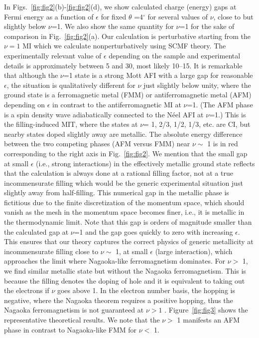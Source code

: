 \documentclass[aps,prl,floatfix,twocolumn]{revtex4-2}
\begin{document}
In Figs.~\ref{fig:fig2}(b)-\ref{fig:fig2}(d), we {show} calculated charge (energy) gaps {at Fermi energy} as a function of $\epsilon$ for fixed {$\theta$ =4$ ^\circ $} for several values of $\nu$, close to but slightly below $\nu$=1.  We also show the same quantity for $\nu$=1 for the sake of comparison in Fig.~\ref{fig:fig2}(a). Our calculation is perturbative starting from the $ \nu=1 $ {MI} which we calculate nonperturbatively using {SCMF} theory. The experimentally relevant value of $\epsilon$ depending on the sample and experimental details is approximately between 5 and 30, {most likely 10--15}.  It is remarkable that although the $\nu$=1 state is a strong Mott AFI with a large gap for {reasonable} $\epsilon$, the situation is qualitatively different for $\nu$ just slightly below unity, where the ground state is a ferromagnetic metal (FMM) or antiferromagnetic metal (AFM) depending on  $ \epsilon $ in contrast to the antiferromagnetic MI at $\nu$=1. (The AFM phase {is} a spin density wave adiabatically connected to the N\'eel AFI at $ \nu $=1.) This is the filling-induced MIT, where the states at {$\nu$= 1, 2/3, 1/2, 1/3, etc.} are {CI}, but nearby states doped slightly away are metallic. The absolute energy difference between the two competing phases (AFM versus FMM) near $ \nu\sim$ 1 is {in} red {corresponding} to the right axis in Fig.~\ref{fig:fig2}.  We mention that the small gap {at} small $\epsilon$ (i.e., strong interactions) in the effectively metallic ground state {reflects} that the calculation is always done at a rational filling factor, not at a true incommensurate filling which would be the generic experimental situation just slightly away from half-filling. This numerical gap in the metallic phase is fictitious due to the finite discretization of the momentum space, which should vanish {as the mesh in the momentum space becomes finer, i.e., it is metallic in the thermodynamic limit.} {Note} that this gap is orders of magnitude smaller than the calculated gap at $\nu$=1 and the gap goes quickly to zero with increasing $\epsilon$.  
This ensures that our theory captures the correct physics of generic metallicity at incommensurate filling close to $\nu\sim$ 1{, at small $\epsilon$ (large interaction), which approaches the limit where Nagaoka-like ferromagnetism dominates}.  
{For $ \nu >$ 1, we find similar metallic state but without the Nagaoka ferromagnetism. This is because the filling denotes the doping of hole and it is equivalent to taking out the electrons if $\nu$ goes above 1. In the electron number basis, the hopping is negative, where the Nagaoka theorem requires a positive hopping, thus the Nagaoka ferromagnetism is not guaranteed at $\nu>1$ .}
Figure~\ref{fig:fig3} shows the representative theoretical results.
We note that the $ \nu>$ 1 manifests an {AFM} phase in contrast to {Nagaoka-like} FMM for $ \nu<$ 1.
\end{document}
